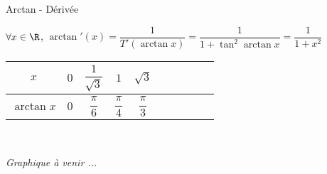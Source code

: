 \documentclass[12pt,a4paper]{report}
\begin{document}
\begin{propositions}{Arctan - Dérivée}{}
\begin{center}
    $\forall x \in \R$, $\arctan'(x)=\dfrac{1}{T'(\arctan x)} = \dfrac{1}{1+\tan^2\arctan x} = \dfrac{1}{1+x^2}$
\end{center}
\end{propositions}

\begin{remarque}
\begin{center}
    \begin{tabular}{|Sc|Sc|Sc|Sc|Sc|}
      \hline
      $x$ & $0$ & $\dfrac{1}{\sqrt{3}}$ & $1$ & $\sqrt{3}$\\
      \hline
      $\arctan x$ & $0$ & $\dfrac{\pi}{6}$ & $\dfrac{\pi}{4}$ & $\dfrac{\pi}{3}$\\
      \hline
     \end{tabular}
     \\
\end{center}
\end{remarque}

\begin{remarque}
\begin{center}
    \textit{Graphique à venir ...}
\end{center}
\end{remarque}
\end{document}
